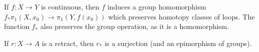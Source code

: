




If $f:X\rightarrow Y$ is continuous, then $f$ induces a group homomorphism $f_*\pi_1(X,x_0)\rightarrow \pi_1(Y,f(x_0))$ which preserves homotopy classes of loops.  The function $f_*$ also preserves the group operation, as it is a homomorphism.

If $r:X\rightarrow A$ is a retract, then $r_*$ is a surjection (and an epimorphism of groups).